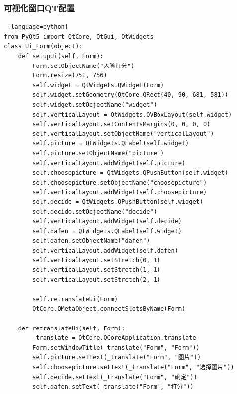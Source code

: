 \documentclass{article}
\begin{document}
\subsubsection{可视化窗口QT配置}

\begin{lstlisting} [language=python]
from PyQt5 import QtCore, QtGui, QtWidgets
class Ui_Form(object):
    def setupUi(self, Form):
        Form.setObjectName("人脸打分")
        Form.resize(751, 756)
        self.widget = QtWidgets.QWidget(Form)
        self.widget.setGeometry(QtCore.QRect(40, 90, 681, 581))
        self.widget.setObjectName("widget")
        self.verticalLayout = QtWidgets.QVBoxLayout(self.widget)
        self.verticalLayout.setContentsMargins(0, 0, 0, 0)
        self.verticalLayout.setObjectName("verticalLayout")
        self.picture = QtWidgets.QLabel(self.widget)
        self.picture.setObjectName("picture")
        self.verticalLayout.addWidget(self.picture)
        self.choosepicture = QtWidgets.QPushButton(self.widget)
        self.choosepicture.setObjectName("choosepicture")
        self.verticalLayout.addWidget(self.choosepicture)
        self.decide = QtWidgets.QPushButton(self.widget)
        self.decide.setObjectName("decide")
        self.verticalLayout.addWidget(self.decide)
        self.dafen = QtWidgets.QLabel(self.widget)
        self.dafen.setObjectName("dafen")
        self.verticalLayout.addWidget(self.dafen)
        self.verticalLayout.setStretch(0, 1)
        self.verticalLayout.setStretch(1, 1)
        self.verticalLayout.setStretch(2, 1)

        self.retranslateUi(Form)
        QtCore.QMetaObject.connectSlotsByName(Form)

    def retranslateUi(self, Form):
        _translate = QtCore.QCoreApplication.translate
        Form.setWindowTitle(_translate("Form", "Form"))
        self.picture.setText(_translate("Form", "图片"))
        self.choosepicture.setText(_translate("Form", "选择图片"))
        self.decide.setText(_translate("Form", "确定"))
        self.dafen.setText(_translate("Form", "打分"))
\end{lstlisting}
\end{document}
